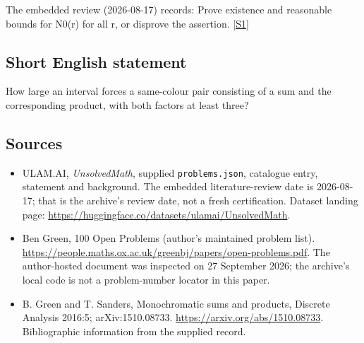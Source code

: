 \documentclass[11pt,a4paper]{article}
\newcommand{\sref}[2]{\hyperlink{source:#1:#2}{[S#2]}}
\begin{document}
The embedded review (2026-08-17) records: Prove existence and reasonable bounds for N0(r) for all r, or disprove the assertion. \sref{statement}{1}

\subsection{Short English statement}

How large an interval forces a same-colour pair consisting of a sum and the corresponding product, with both factors at least three?

\subsection{Sources}

{\small

\begin{itemize}

\item[\hypertarget{source:statement:1}{S1}] ULAM.AI, \emph{UnsolvedMath}, supplied \texttt{problems.json}, catalogue entry, statement and background. The embedded literature-review date is 2026-08-17; that is the archive’s review date, not a fresh certification. Dataset landing page: \url{https://huggingface.co/datasets/ulamai/UnsolvedMath}.

\item[\hypertarget{source:statement:2}{S2}] Ben Green, 100 Open Problems (author’s maintained problem list). \url{https://people.maths.ox.ac.uk/greenbj/papers/open-problems.pdf}. The author-hosted document was inspected on 27 September 2026; the archive’s local code is not a problem-number locator in this paper.

\item[\hypertarget{source:statement:3}{S3}] B. Green and T. Sanders, Monochromatic sums and products, Discrete Analysis 2016:5; arXiv:1510.08733. \url{https://arxiv.org/abs/1510.08733}. Bibliographic information from the supplied record.

\end{itemize}

}

\label{end:statement}
\end{document}

